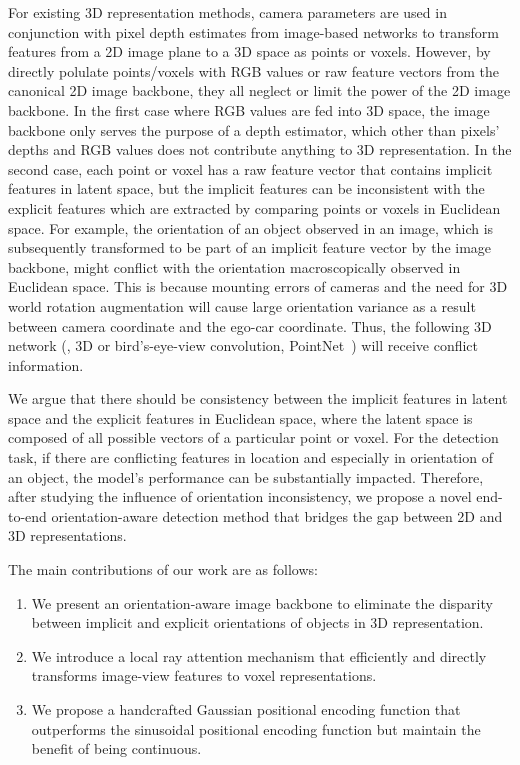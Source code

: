 \documentclass[10pt,twocolumn,letterpaper]{article}
\begin{document}
For existing 3D representation methods, camera parameters are used in conjunction with pixel depth estimates from image-based networks to transform features from a 2D image plane to a 3D space as points or voxels. However, by directly polulate points/voxels with RGB values or raw feature vectors from the canonical 2D image backbone, they all neglect or limit the power of the 2D image backbone. In the first case where RGB values are fed into 3D space, the image backbone only serves the purpose of a depth estimator, which other than pixels' depths and RGB values does not contribute anything to 3D representation. In the second case, each point or voxel has a raw feature vector that contains implicit features in latent space, but the implicit features can be inconsistent with the explicit features which are extracted by comparing points or voxels in Euclidean space. For example, the orientation of an object observed in an image, which is subsequently transformed to be part of an implicit feature vector by the image backbone, might conflict with the orientation macroscopically observed in Euclidean space. This is because mounting errors of cameras and the need for 3D world rotation augmentation \cite{10.1007/978-3-030-58568-6_12, yan2018second} will cause large orientation variance as a result between camera coordinate and the ego-car coordinate. Thus, the following 3D network (\eg, 3D or bird's-eye-view convolution, PointNet~\cite{qi2017pointnet}) will receive conflict information. 

We argue that there should be consistency between the implicit features in latent space and the explicit features in Euclidean space, where the latent space is composed of all possible vectors of a particular point or voxel. For the detection task, if there are conflicting features in location and especially in orientation of an object, the model's performance can be substantially impacted. Therefore, after studying the influence of orientation inconsistency, we propose a novel end-to-end orientation-aware detection method that bridges the gap between 2D and 3D representations. 

The main contributions of our work are as follows:

\begin{enumerate}
\setlength\itemsep{0em}
\item We present an orientation-aware image backbone to eliminate the disparity between implicit and explicit orientations of objects in 3D representation. 
\item We introduce a local ray attention mechanism that efficiently and directly transforms image-view features to voxel representations.
\item We propose a handcrafted Gaussian positional encoding function that outperforms the sinusoidal positional encoding function but maintain the benefit of being continuous.
\end{enumerate}
\end{document}

